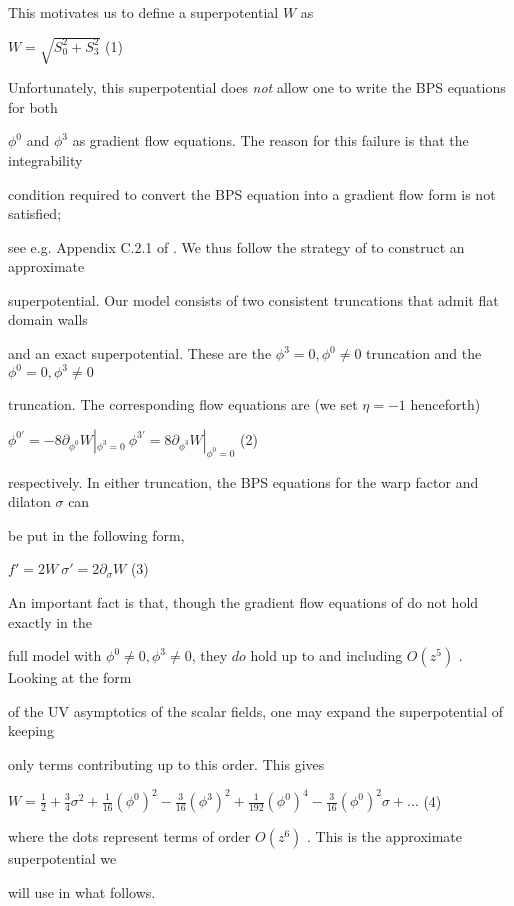 \documentclass[a4paper,12pt]{article}
\begin{document}
This motivates us to define a superpotential $W$ as
\begin{center}
$W=\sqrt{S_{0}^{2}+S_{3}^{2}}$   (1)
\end{center}
Unfortunately, this superpotential does {\it not} allow one to write the BPS equations for both

$\phi^{0}$ and $\phi^{3}$ as gradient flow equations. The reason for this failure is that the integrability

condition required to convert the BPS equation into a gradient flow form is not satisfied;

see e.g. Appendix C.2.1 of . We thus follow the strategy of to construct an approximate

superpotential. Our model consists of two consistent truncations that admit flat domain walls

and an exact superpotential. These are the $\phi^{3}=0, \phi^{0}\neq 0$ truncation and the $\phi^{0}=0, \phi^{3}\neq 0$

truncation. The corresponding flow equations are (we set $\eta=-1$ henceforth)
\begin{center}
$\phi^{0'}=-8\partial_{\phi^{0}}W|_{\phi^{3}=0}\ \phi^{3'}=8\partial_{\phi^{3}}W|_{\phi^{0}=0}$   (2)
\end{center}
respectively. In either truncation, the BPS equations for the warp factor and dilaton $\sigma$ can

be put in the following form,
\begin{center}
$f'=2W\ \sigma'=2\partial_{\sigma}W$   (3)
\end{center}
An important fact is that, though the gradient flow equations of do not hold exactly in the

full model with $\phi^{0}\neq 0, \phi^{3}\neq 0$, they $do$ hold up to and including $O(z^{5})$ . Looking at the form

of the UV asymptotics of the scalar fields, one may expand the superpotential of keeping

only terms contributing up to this order. This gives
\begin{center}
$ W=\displaystyle \frac{1}{2}+\frac{3}{4}\sigma^{2}+\frac{1}{16}(\phi^{0})^{2}-\frac{3}{16}(\phi^{3})^{2}+\frac{1}{192}(\phi^{0})^{4}-\frac{3}{16}(\phi^{0})^{2}\sigma+\ldots$   (4)
\end{center}
where the dots represent terms of order $O(z^{6})$ . This is the approximate superpotential we

will use in what follows.
\end{document}
